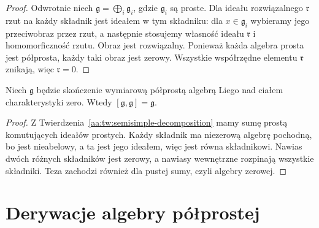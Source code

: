 \begin{proof}
Odwrotnie niech $\mathfrak g=\bigoplus_i\mathfrak g_i$,
gdzie $\mathfrak g_i$ są proste. Dla ideału
rozwiązalnego $\mathfrak r$ rzut na każdy składnik
jest ideałem w tym składniku: dla $x\in\mathfrak g_i$
wybieramy jego przeciwobraz przez rzut, a następnie
stosujemy własność ideału $\mathfrak r$ i
homomorficzność rzutu. Obraz jest rozwiązalny.
Ponieważ każda algebra prosta jest półprosta,
każdy taki obraz jest zerowy. Wszystkie współrzędne
elementu $\mathfrak r$ znikają, więc $\mathfrak r=0$.
\end{proof}

\begin{wniosek}
\label{aa:cor:semisimple-perfect}
Niech $\mathfrak g$ będzie skończenie wymiarową
półprostą algebrą Liego nad ciałem charakterystyki
zero. Wtedy $[\mathfrak g,\mathfrak g]=\mathfrak g$.
\end{wniosek}
\begin{proof}
Z Twierdzenia~\ref{aa:tw:semisimple-decomposition}
mamy sumę prostą komutujących ideałów prostych.
Każdy składnik ma niezerową algebrę pochodną,
bo jest nieabelowy, a ta jest jego ideałem,
więc jest równa składnikowi. Nawias dwóch różnych
składników jest zerowy, a nawiasy wewnętrzne
rozpinają wszystkie składniki. Teza zachodzi
również dla pustej sumy, czyli algebry zerowej.
\end{proof}

\section{Derywacje algebry półprostej}

